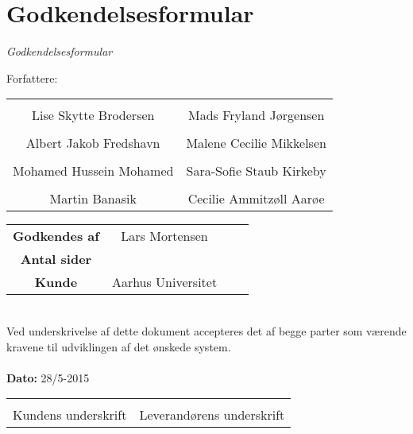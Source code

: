 \chapter{Godkendelsesformular}

{\LARGE\textit{Godkendelsesformular}}

{\large Forfattere:}
\\[5ex]


\begin{tabular}{c c}
\centering 
	\makebox[2.0in]{\hrulefill} & \makebox[2.0in]{\hrulefill}\\
	Lise Skytte Brodersen & Mads Fryland Jørgensen\\[7ex]
	\makebox[2.0in]{\hrulefill} & \makebox[2.0in]{\hrulefill}\\
	Albert Jakob Fredshavn & Malene Cecilie Mikkelsen\\[7ex]
	\makebox[2.0in]{\hrulefill} & \makebox[2.0in]{\hrulefill}\\
	Mohamed Hussein Mohamed & Sara-Sofie Staub Kirkeby\\[7ex]
	\makebox[2.0in]{\hrulefill} & \makebox[2.0in]{\hrulefill}\\
	Martin Banasik & Cecilie Ammitzøll Aarøe\\[7ex]

\end{tabular}

\begin{tabular}{c c c c}
	\textbf{Godkendes af} & Lars Mortensen\\[3ex]
	\textbf{Antal sider} & \pageref{LastPage} \\[3ex]
	\textbf{Kunde} & Aarhus Universitet
\end{tabular}\\[8ex]
Ved underskrivelse af dette dokument accepteres det af begge parter som værende kravene til udviklingen af det ønskede system.
\\
\\
\textbf{Dato: } 28/5-2015\\[7ex]

\begin{tabular}{c c}
	\makebox[2.0in]{\hrulefill} & \makebox[2.0in]{\hrulefill}\\
	\centering 
	Kundens underskrift & Leverandørens underskrift
\end{tabular}
